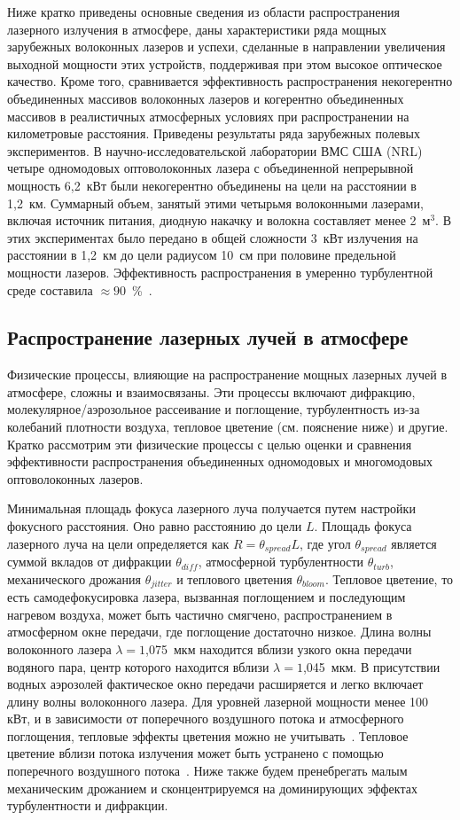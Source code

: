 Ниже кратко приведены основные сведения из области распространения лазерного излучения в атмосфере, даны характеристики ряда мощных зарубежных волоконных лазеров и успехи, сделанные в направлении увеличения выходной мощности этих устройств, поддерживая при этом высокое оптическое качество. Кроме того, сравнивается эффективность распространения некогерентно объединенных массивов волоконных лазеров и когерентно объединенных массивов в реалистичных атмосферных условиях при распространении на километровые расстояния. Приведены результаты ряда зарубежных полевых экспериментов. В научно-исследовательской лаборатории ВМС США (NRL) четыре одномодовых оптоволоконных лазера с объединенной непрерывной мощность 6,2~кВт были некогерентно объединены на цели на расстоянии в 1,2~км. Суммарный объем, занятый этими четырьмя волоконными лазерами, включая источник питания, диодную накачку и волокна составляет менее 2~м$^3$. В этих экспериментах было передано в общей сложности 3~кВт излучения на расстоянии в 1,2~км до цели радиусом 10~см при половине предельной мощности лазеров. Эффективность распространения  в умеренно турбулентной среде составила $\approx 90$~\%~\cite{Jain96}.

\subsection{Распространение лазерных лучей в атмосфере}

Физические процессы, влияющие на распространение мощных лазерных лучей в атмосфере, сложны и взаимосвязаны. Эти процессы включают дифракцию, молекулярное/аэрозольное рассеивание и поглощение, турбулентность из-за колебаний плотности воздуха, тепловое цветение (см. пояснение ниже) и другие. Кратко рассмотрим эти физические процессы с целью оценки и сравнения эффективности распространения объединенных одномодовых и многомодовых оптоволоконных лазеров.

Минимальная площадь фокуса лазерного луча получается путем настройки фокусного расстояния. Оно равно расстоянию до цели $L$. Площадь фокуса лазерного луча на цели определяется как $R = \theta_{spread} L$, где угол $\theta_{spread}$ является суммой вкладов от дифракции $\theta_{diff}$, атмосферной турбулентности $\theta_{turb}$, механического дрожания $\theta_{jitter}$ и теплового цветения $\theta_{bloom}$. Тепловое цветение, то есть самодефокусировка лазера, вызванная поглощением и последующим нагревом воздуха, может быть частично смягчено, распространением в атмосферном окне передачи, где поглощение достаточно низкое. Длина волны волоконного лазера $\lambda = 1$,075~мкм находится вблизи узкого окна передачи водяного пара, центр которого находится вблизи $\lambda = 1$,045~мкм. В присутствии водных аэрозолей фактическое окно передачи расширяется и легко включает длину волны волоконного лазера. Для уровней лазерной мощности менее 100 кВт, и в зависимости от поперечного воздушного потока и атмосферного поглощения, тепловые эффекты цветения можно не учитывать~\cite{NRL3}. Тепловое цветение вблизи потока излучения может быть устранено с помощью поперечного воздушного потока~\cite{NRL5}. Ниже также будем пренебрегать малым механическим дрожанием и сконцентрируемся на доминирующих эффектах турбулентности и дифракции.

